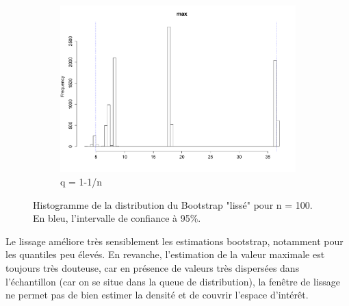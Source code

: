 \documentclass{article}
\renewcommand*{\(}{\left(}
\renewcommand*{\)}{\right)}
\begin{document}
\begin{figure}[H]
\begin{subfigure}[b]{0.3\textwidth}
        \includegraphics[width = \linewidth]{img/BootstrapSmooth-Max-100.pdf}
        \caption{q = 1-1/n}
        \label{fig:smoothBMax}
    \end{subfigure}%
    \caption{Histogramme de la distribution du Bootstrap "lissé" pour n = 100. En bleu, l'intervalle de confiance à 95\%.}
    \label{fig:smoothB}
\end{figure}

Le lissage améliore très sensiblement les estimations bootstrap, notamment pour les quantiles peu élevés. En revanche, l'estimation de la valeur maximale est toujours très douteuse, car en présence de valeurs très dispersées dans l'échantillon (car on se situe dans la queue de distribution), la fenêtre de lissage ne permet pas de bien estimer la densité et de couvrir l'espace d'intérêt.

\end{document}
